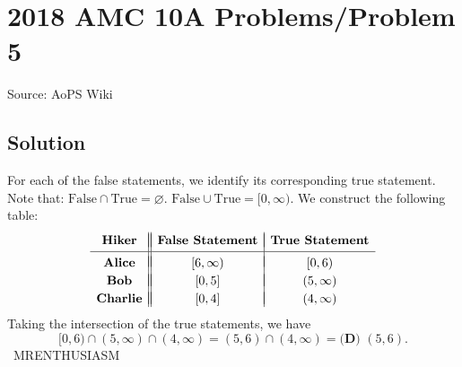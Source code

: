 \documentclass[12pt]{article}
\begin{document}
\section*{{2018 AMC 10A Problems/Problem 5}}
Source: AoPS Wiki

\subsection*{Solution}
For each of the false statements, we identify its corresponding true statement. Note that: $\mathrm{False}\cap\mathrm{True}=\varnothing.$ $\mathrm{False}\cup\mathrm{True}=[0,\infty).$ We construct the following table: \[\begin{array}{c||c|c} & & \\ [-2.5ex] \textbf{Hiker} & \textbf{False Statement} & \textbf{True Statement} \\ [0.5ex] \hline & & \\ [-2ex] \textbf{Alice} & [6,\infty) & [0,6) \\ & & \\ [-2.25ex] \textbf{Bob} & [0,5] & (5,\infty) \\ & & \\ [-2.25ex] \textbf{Charlie} & [0,4] & (4,\infty) \end{array}\] Taking the intersection of the true statements, we have \[[0,6)\cap(5,\infty)\cap(4,\infty)=(5,6)\cap(4,\infty)=\boxed{\textbf{(D) } (5,6)}.\] ~MRENTHUSIASM
\end{document}
